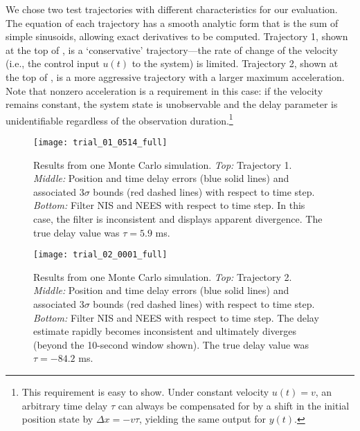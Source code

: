 \documentclass[letterpaper,10pt,conference]{ieeeconf}
\theoremstyle{definition}
\begin{document}
We chose two test trajectories with different characteristics for our evaluation.
%
The equation of each trajectory has a smooth analytic form that is the sum of simple sinusoids, allowing exact derivatives to be computed. 
%
Trajectory 1, shown at the top of , is a `conservative' trajectory---the rate of change of the velocity (i.e., the control input $u(t)$ to the system) is limited.
%
Trajectory 2, shown at the top of , is a more aggressive trajectory with a larger maximum acceleration.
%
Note that nonzero acceleration is a requirement in this case: if the velocity remains constant, the system state is unobservable and the delay parameter is unidentifiable regardless of the observation duration.\footnote{This requirement is easy to show. Under constant velocity $u(t) = v$, an arbitrary time delay $\tau$ can always be compensated for by a shift in the initial position state by $\Delta x = -v\tau$, yielding the same output for $y(t)$.}

\begin{figure}[t]
\centering
\texttt{[image: trial\_01\_0514\_full]}
\caption{Results from one Monte Carlo simulation. \emph{Top:} Trajectory 1. \emph{Middle:} Position and time delay errors (blue solid lines) and associated 3$\sigma$ bounds (red dashed lines) with respect to time step. \emph{Bottom:} Filter NIS and NEES with respect to time step. In this case, the filter is inconsistent and displays apparent divergence. The true delay value was $\tau = 5.9$ ms.} 
\label{fig:traj1_results}
\vspace*{-3mm}
\end{figure}

\begin{figure}[t]
\centering
\texttt{[image: trial\_02\_0001\_full]}
\caption{Results from one Monte Carlo simulation. \emph{Top:} Trajectory 2. \emph{Middle:} Position and time delay errors (blue solid lines) and associated 3$\sigma$ bounds (red dashed lines) with respect to time step. \emph{Bottom:} Filter NIS and NEES with respect to time step. The delay estimate rapidly becomes inconsistent and ultimately diverges (beyond the 10-second window shown). The true delay value was $\tau = -84.2$ ms.}
\label{fig:traj2_results}
\vspace*{-3mm}
\end{figure}
\end{document}
